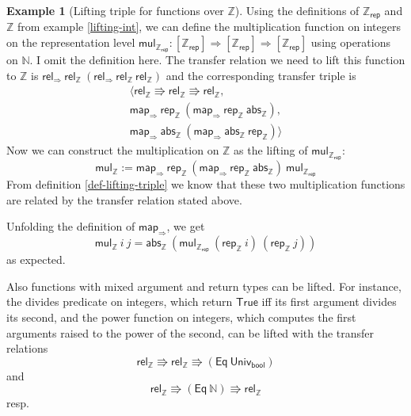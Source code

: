 \documentclass[]{article}
\theoremstyle{definition}
\newtheorem{example}{Example}[section]
\newcommand{\eq}{\mathsf{Eq}}
\newcommand{\mapfun}{\mathsf{map_\Rightarrow}}
\newcommand{\relfun}{\mathsf{rel_\Rightarrow}}
\newcommand{\univ}{\mathsf{Univ}}
\newcommand{\nat}{\mathbb{N}}
\newcommand{\inte}{\mathbb{Z}}
\newcommand{\abs}{\mathsf{abs}}
\newcommand{\rep}{\mathsf{rep}}
\newcommand{\true}{\mathsf{True}}
\newcommand{\relint}{\mathsf{rel_\inte}}
\begin{document}
\begin{example}[Lifting triple for functions over \(\inte\)]
	Using the definitions of \(\inte_{\rep}\) and \(\inte\) from example \ref{lifting-int}, we can define the multiplication function on integers on the representation level \(\mathsf{mul_{\inte_{\rep}}} : [\inte_{\rep}] \Rightarrow [\inte_{\rep}] \Rightarrow [\inte_{\rep}]\) using operations on \(\nat\). I omit the definition here. The transfer relation we need to lift this function to \(\inte\) is \(\relfun\ \relint\ (\relfun\ \relint\ \relint)\) and the corresponding transfer triple is
	\begin{align*}
		\langle \relint \Rrightarrow \relint \Rrightarrow \relint,\\
		\mapfun\ \rep_\inte\ (\mapfun\ \rep_\inte\ \abs_\inte),\\
		\mapfun\ \abs_\inte\ (\mapfun\ \abs_\inte\ \rep_\inte) \rangle
	\end{align*}
	 Now we can construct the multiplication on \(\inte\) as the lifting of \(\mathsf{mul_{\inte_{\rep}}}\):
	\begin{equation*}
		\mathsf{mul_\inte} := \mapfun\ \rep_\inte\ (\mapfun\ \rep_\inte\ \abs_\inte)\ \mathsf{mul_{\inte_{\rep}}}
	\end{equation*}
	From definition \ref{def-lifting-triple} we know that these two multiplication functions are related by the transfer relation stated above.
	
	Unfolding the definition of \(\mapfun\), we get
	\begin{equation*}
		\mathsf{mul_\inte}\ i\ j = \abs_\inte\ (\mathsf{mul_{\inte_{\rep}}}\ (\rep_\inte\ i)\ (\rep_\inte\ j))
	\end{equation*}
	as expected.
	
	Also functions with mixed argument and return types can be lifted. For instance, the divides predicate on integers, which return \(\true\) iff its first argument divides its second, and the power function on integers, which computes the first arguments raised to the power of the second, can be lifted with the transfer relations
	\begin{equation*}
		\relint \Rrightarrow \relint \Rrightarrow (\eq\ \univ_{\mathsf{bool}})
	\end{equation*}
	and
	\begin{equation*}
		\relint \Rrightarrow (\eq\ \nat) \Rrightarrow \relint
	\end{equation*}
	resp.
\end{example}
\end{document}
